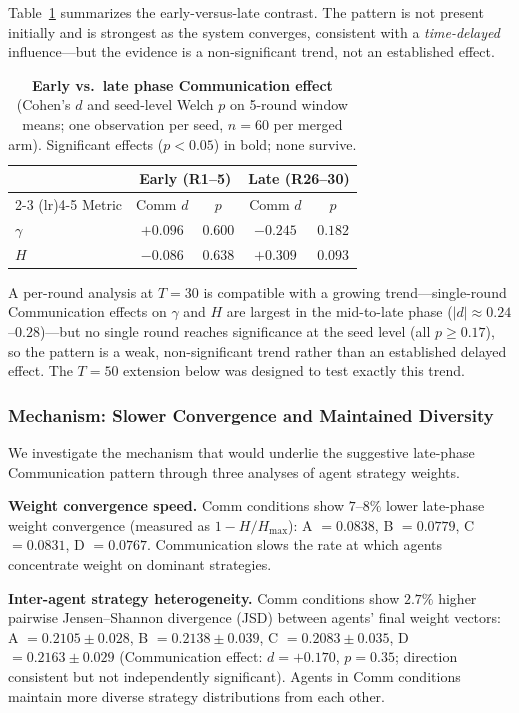 \documentclass[11pt]{article}
\theoremstyle{definition}
\theoremstyle{remark}
\begin{document}
Table~\ref{tab:joint_early_late} summarizes the early-versus-late contrast. The pattern is not present initially and is strongest as the system converges, consistent with a \textit{time-delayed} influence---but the evidence is a non-significant trend, not an established effect.

\begin{table}[H]
\centering
\caption{\textbf{Early vs.\ late phase Communication effect} (Cohen's $d$ and seed-level Welch $p$ on 5-round window means; one observation per seed, $n{=}60$ per merged arm). Significant effects ($p < 0.05$) in bold; none survive.}
\label{tab:joint_early_late}
\begin{tabular}{@{}lcccc@{}}
\toprule
 & \multicolumn{2}{c}{Early (R1--5)} & \multicolumn{2}{c}{Late (R26--30)} \\
\cmidrule(lr){2-3} \cmidrule(lr){4-5}
Metric & Comm $d$ & $p$ & Comm $d$ & $p$ \\
\midrule
$\gamma$ & $+0.096$ & $0.600$ & $-0.245$ & $0.182$ \\
$H$ & $-0.086$ & $0.638$ & $+0.309$ & $0.093$ \\
\bottomrule
\end{tabular}
\end{table}

A per-round analysis at $T{=}30$ is compatible with a growing trend---single-round Communication effects on $\gamma$ and $H$ are largest in the mid-to-late phase ($|d| \approx 0.24$--$0.28$)---but no single round reaches significance at the seed level (all $p \geq 0.17$), so the pattern is a weak, non-significant trend rather than an established delayed effect. The $T{=}50$ extension below was designed to test exactly this trend.

\subsubsection{Mechanism: Slower Convergence and Maintained Diversity}

We investigate the mechanism that would underlie the suggestive late-phase Communication pattern through three analyses of agent strategy weights.

\textbf{Weight convergence speed.} Comm conditions show $7$--$8\%$ lower late-phase weight convergence (measured as $1 - H/H_{\max}$): A $=0.0838$, B $=0.0779$, C $=0.0831$, D $=0.0767$. Communication slows the rate at which agents concentrate weight on dominant strategies.

\textbf{Inter-agent strategy heterogeneity.} Comm conditions show $2.7\%$ higher pairwise Jensen--Shannon divergence (JSD) between agents' final weight vectors: A $=0.2105 \pm 0.028$, B $=0.2138 \pm 0.039$, C $=0.2083 \pm 0.035$, D $=0.2163 \pm 0.029$ (Communication effect: $d{=}+0.170$, $p{=}0.35$; direction consistent but not independently significant). Agents in Comm conditions maintain more diverse strategy distributions from each other.
\end{document}
